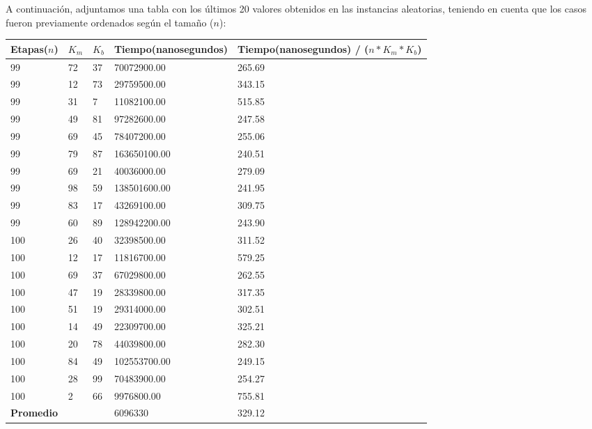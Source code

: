 A continuación, adjuntamos una tabla con los últimos 20 valores obtenidos en las instancias aleatorias, teniendo en cuenta que los casos fueron previamente ordenados según el tamaño ($n$):

\begin{table}[H]
\parbox{0.3\textwidth}{
    \begin{tabular}{ | l | l | l | l | l |}
    \hline
	Etapas($n$)	&$K_m$	&$K_b$	&Tiempo(nanosegundos)	&Tiempo(nanosegundos) / ($n*K_m*K_b$)	\\ \hline
    99  &72  &37  &70072900.00  &265.69 \\ \hline
    99  &12  &73  &29759500.00  &343.15 \\ \hline
    99  &31  &7  &11082100.00  &515.85 \\ \hline
    99  &49  &81  &97282600.00  &247.58 \\ \hline
    99  &69  &45  &78407200.00  &255.06 \\ \hline
    99  &79  &87  &163650100.00  &240.51 \\ \hline
    99  &69  &21  &40036000.00  &279.09 \\ \hline
    99  &98  &59  &138501600.00  &241.95 \\ \hline
    99  &83  &17  &43269100.00  &309.75 \\ \hline
    99  &60  &89  &128942200.00  &243.90 \\ \hline
    100  &26  &40  &32398500.00  &311.52 \\ \hline
    100  &12  &17  &11816700.00  &579.25 \\ \hline
    100  &69  &37  &67029800.00  &262.55 \\ \hline
    100  &47  &19  &28339800.00  &317.35 \\ \hline
    100  &51  &19  &29314000.00  &302.51 \\ \hline
    100  &14  &49  &22309700.00  &325.21 \\ \hline
    100  &20  &78  &44039800.00  &282.30 \\ \hline
    100  &84  &49  &102553700.00  &249.15 \\ \hline
    100  &28  &99  &70483900.00  &254.27 \\ \hline
    100  &2  &66  &9976800.00  &755.81 \\ \hline
    \textbf{Promedio} &{} &{}  &6096330	&329.12 \\ \hline

    \end{tabular}
}
\end{table}

